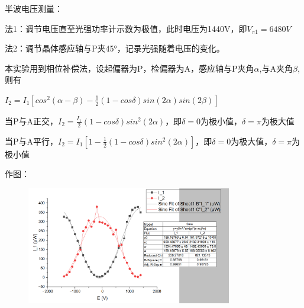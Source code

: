\documentclass[font=default]{mpltx}
\begin{document}
半波电压测量：

法1：调节电压直至光强功率计示数为极值，此时电压为1440V，即$V_{\pi1} = 6480V$

法2：调节晶体感应轴与P夹45°，记录光强随着电压的变化。

本实验用到相位补偿法，设起偏器为P，检偏器为A，感应轴与P夹角$\alpha$,与A夹角$\beta$,则有

$I_2 = I_1[cos^2 (\alpha - \beta) - \frac{1}{2} (1 - cos\delta)sin(2\alpha)sin(2\beta)]$

当P与A正交，$I_2 = \frac{I_1}{2} (1 - cos\delta)sin^2(2\alpha)$，即$\delta = 0$为极小值，$\delta = \pi$为极大值

当P与A平行，$I_2 = I_1[1 - \frac{1}{2} (1 - cos\delta)sin^2(2\alpha)]$，即$\delta = 0$为极大值，$\delta = \pi$为极小值

作图：

\begin{figure}
  \centering
  \includegraphics[width=0.8\textwidth]{fig/data.png}
  \label{ssec:data}
\end{figure}
\end{document}
